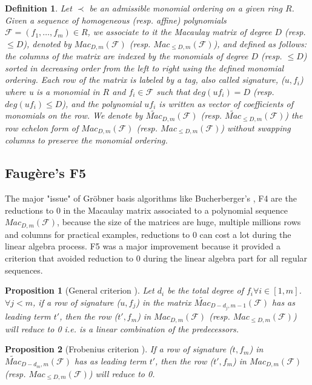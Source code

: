 \documentclass[english]{article}
\newtheorem{proposition}{Proposition}[section]
\newtheorem{definition}{Definition}[section]
\newcommand{\Mac}[3]{{Mac_{#1, #2}(\mathcal{#3})}}
\newcommand{\Mact}[3]{{\widetilde{Mac}_{#1, #2}(\mathcal{#3})}}
\begin{document}
		\begin{definition}
			Let $\prec$ be an admissible monomial ordering on a given ring $R$. Given a sequence of homogeneous (resp. affine) polynomials $\mathcal{F} = (f_1,\dots,f_m) \in R$, we associate to it the Macaulay matrix of degree $D$ (resp. $\leq D$), denoted by $\Mac{D}{m}{\mathcal{F}}$ (resp. $\Mac{\leq D}{m}{\mathcal{F}}$), and defined as follows: the columns of the matrix are indexed by the monomials of degree $D$ (resp. $\leq D$) sorted in decreasing order from the left to right using the defined monomial ordering. Each row of the matrix is labeled by a tag, also called signature, ($u, f_i$) where u is a monomial in $R$ and $f_i \in \mathcal{F}$ such that $deg(uf_i) = D$ (resp. $deg(uf_i) \leq D$), and the polynomial $uf_i$ is written as vector of coefficients of monomials on the row. We denote by $\Mact{D}{m}{F}$ (resp. $\Mact{\leq D}{m}{F}$) the row echelon form of $\Mac{D}{m}{\mathcal{F}}$ (resp. $\Mac{\leq D}{m}{\mathcal{F}}$) without swapping columns to preserve the monomial ordering.
		\end{definition}
		
		\subsection{Faugère's F5}
		
		The major "issue" of Gröbner basis algorithms like Bucherberger's \cite{Buc}, F4 \cite{F02} are the reductions to 0 in the Macaulay matrix associated to a polynomial sequence $\Mac{D}{m}{F}$, because the size of the matrices are huge, multiple millions rows and columns for practical examples,
		reductions to 0 can cost a lot during the linear algebra process. F5 \cite{F02} was a major improvement because it provided a criterion that avoided reduction to 0 during the linear algebra part for all regular sequences.
		
		\begin{proposition}[General criterion \cite{F02}]
			\label{F5Crit}
			Let $d_i$ be the total degree of $f_i \forall i \in [1,m]$.
			$\forall j < m$, if a row of signature ($u, f_j$) in the matrix $\Mact{D-d_j}{m-1}{F}$ has as leading term $t'$, then the row ($t', f_m$) in $\Mac{D}{m}{F}$ (resp. $\Mac{\leq D}{m}{F}$) will reduce to 0 i.e. is a linear combination of the predecessors.
		\end{proposition}
		
		\begin{proposition}[Frobenius criterion \cite{F02}]
			\label{Frob}
			If a row of signature ($t, f_m$) in $\Mact{D - d_m}{m}{F}$ has as leading term $t'$, then the row ($t', f_m$) in $\Mac{D}{m}{F}$ (resp. $\Mac{\leq D}{m}{F}$) will reduce to 0.
		\end{proposition}
		
\end{document}

